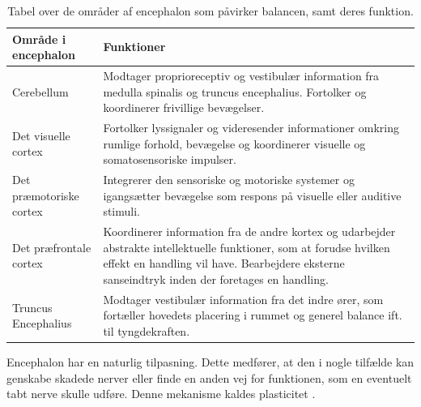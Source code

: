 \begin{center}
\begin{table} [H]
  \begin{tabular}{ | l | p{8cm} |}
    \hline
    \textbf{Område i encephalon} & \textbf{Funktioner} \\ \hline
 	Cerebellum & Modtager proprioreceptiv og vestibulær information fra medulla spinalis og truncus encephalius.  Fortolker og koordinerer frivillige bevægelser. \\ \hline
 	Det visuelle cortex & Fortolker lyssignaler og videresender informationer omkring rumlige forhold, bevægelse og koordinerer visuelle og somatosensoriske impulser. \\ \hline
 	Det præmotoriske cortex & Integrerer den sensoriske og motoriske systemer og igangsætter bevægelse som respons på visuelle eller auditive stimuli. \\ \hline
 	Det præfrontale cortex & Koordinerer information fra de andre kortex og udarbejder abstrakte intellektuelle funktioner, som at forudse hvilken effekt en handling vil have. Bearbejdere eksterne sanseindtryk inden der foretages en handling. \\ \hline
 	Truncus Encephalius & Modtager vestibulær information fra det indre ører, som fortæller hovedets placering i rummet og generel balance ift. til tyngdekraften. \\
    \hline
    \end{tabular}
    \caption{Tabel over de områder af encephalon som påvirker balancen, samt deres funktion. \cite{Martini2012, Moos2010}}
    \label{tabelencephalon}
\end{table}
\end{center}


Encephalon har en naturlig tilpasning. Dette medfører, at den i nogle tilfælde kan genskabe skadede nerver eller finde en anden vej for funktionen, som en eventuelt tabt nerve skulle udføre. \cite{Martini2012} Denne mekanisme kaldes plasticitet \cite{Ramanathan2006}. 

